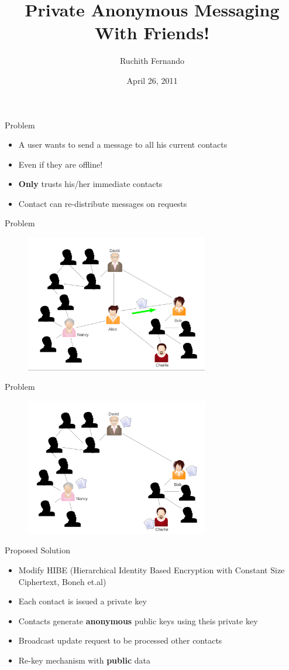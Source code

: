 \documentclass{beamer}
\title[CS 626 : Project Presentation]{Private Anonymous Messaging \\With Friends!}
\author{Ruchith Fernando}
\institute{Purdue University}
\date{April 26, 2011}
\begin{document}
\begin{frame}
\titlepage
\end{frame}


\begin{frame}{Problem}
\begin{itemize}
\item A user wants to send a message to all his current contacts
\item Even if they are offline!
\item \textbf{Only} trusts his/her immediate contacts
\item Contact can re-distribute messages on requests
\end{itemize}
\end{frame}


\begin{frame}{Problem}
\begin{figure}
\includegraphics[height=6cm]{img/img1.png} 
\end{figure}
\end{frame}


\begin{frame}{Problem}
\begin{figure}
\includegraphics[height=6cm]{img/img2.png} 
\end{figure}
\end{frame}

\begin{frame}{Proposed Solution}
\begin{itemize}
\item Modify HIBE (Hierarchical Identity Based Encryption with
Constant Size Ciphertext, Boneh et.al)
\item Each contact is issued a private key
\item Contacts generate \textbf{anonymous} public keys using theis private key
\item Broadcast update request to be processed other contacts 
\item Re-key mechanism with \textbf{public} data
\end{itemize}
\end{frame}
\end{document}
